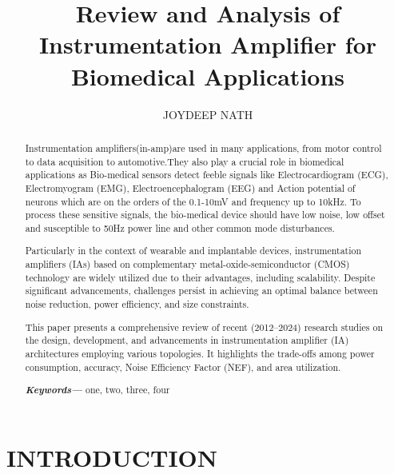 \documentclass[]{article}
\title{Review and Analysis of Instrumentation Amplifier for Biomedical  Applications}
\author{JOYDEEP NATH}
\affil{Department of Electronics and Communication Engineering(ECE),Assam University,\\Silchar,Cachar,Assam,India}
\providecommand{\keywords}[1]
{
	\small	
	\textbf{\textit{Keywords---}} #1
}
\begin{document}
\maketitle


\begin{abstract}
	
		Instrumentation amplifiers(in-amp)are used in many applications,
		from motor control to data acquisition to automotive.They also play a crucial role in biomedical applications as Bio-medical sensors detect feeble signals like Electrocardiogram (ECG), Electromyogram (EMG), Electroencephalogram (EEG) and Action potential of neurons which are on the orders of the 0.1-10mV and frequency up to 10kHz.
		To process these sensitive signals, the bio-medical device should have low noise, low offset and susceptible to 50Hz power line and other common mode disturbances.
		
	   Particularly in the context of wearable and implantable devices, instrumentation amplifiers (IAs) based on complementary metal-oxide-semiconductor (CMOS) technology are widely utilized due to their advantages, including scalability. Despite significant advancements, challenges persist in achieving an optimal balance between noise reduction, power efficiency, and size constraints.
	  
		This paper presents a comprehensive review of recent (2012–2024) research studies on the design, development, and advancements in instrumentation amplifier (IA) architectures employing various topologies. It highlights the trade-offs among power consumption, accuracy, Noise Efficiency Factor (NEF), and area utilization.

\keywords{one, two, three, four}
\end{abstract}
\vspace{4cm}


\section{INTRODUCTION}
\end{document}
